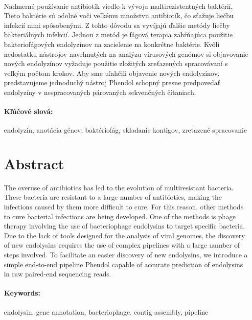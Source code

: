 \documentclass[12pt, twoside]{book}
\begin{document}
\paragraph*{}
Nadmerné používanie antibiotík viedlo k vývoju multirezistentných baktérií. Tieto baktérie sú odolné voči veľkému množstvu antibiotík, čo sťažuje liečbu infekcií nimi spôsobenými. Z tohto dôvodu sa vyvíjajú ďalšie metódy liečby bakteriálnych infekcií. Jednou z metód je fágová terapia zahŕňajúca použitie bakteriofágových endolyzínov na zacielenie na konkrétne baktérie. Kvôli nedostatku nástrojov navrhnutých na analýzu vírusových genómov si objavovanie nových endolyzínov vyžaduje použitie zložitých zreťazených spracovávaní s veľkým počtom krokov. Aby sme uľahčili objavenie nových endolyzínov, predstavujeme jednoduchý nástroj Phendol schopný presne predpovedať endolyzíny v nespracovaných párovaných sekvenčných čítaniach.

\paragraph*{Kľúčové slová:} endolyzín, anotácia génov, baktériofág, skladanie kontigov, zreťazené spracovanie


\newpage 
\section*{Abstract}
\paragraph*{}
The overuse of antibiotics has led to the evolution of multiresistant bacteria. These bacteria are resistant to a large number of antibiotics, making the infections caused by them more difficult to cure. For this reason, other methods to cure bacterial infections are being developed. One of the methods is phage therapy involving the use of bacteriophage endolysins to target specific bacteria. Due to the lack of tools designed for the analysis of viral genomes, the discovery of new endolysins requires the use of complex pipelines with a large number of steps involved. To facilitate an easier discovery of new endolysins, we introduce a simple end-to-end pipeline Phendol capable of accurate prediction of endolysins in raw paired-end sequencing reads.

\paragraph*{Keywords:} endolysin, gene annotation, bacteriophage, contig assembly, pipeline
\end{document}
